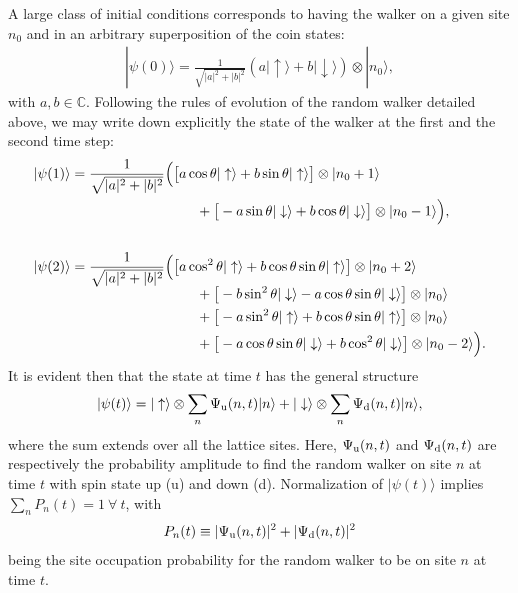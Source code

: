 \documentclass[12pt]{iopart}
\def\uarr{\uparrow}
\def\darr{\downarrow}
\def\ra{\rangle}
\begin{document}
A large class of
initial conditions corresponds to having the walker on a given site
$n_0$ and
in an arbitrary superposition of the coin states: 
\begin{align}
|\psi(0)\ra=\frac{1}{\sqrt{|a|^2+|b|^2}}\left(a|\uarr\ra+b|\darr\ra\right)\otimes
|n_0\ra,
\label{eq:qua-psi0}
\end{align}
with $a,b \in \mathbb{C}$. Following the rules of evolution of the random walker detailed above, we
may write down explicitly the state of the walker at the first and the
second time step:
\begin{equation}
\begin{aligned}
|\psi(1)\ra &=\frac{1}{\sqrt{|a|^2+|b|^2}}\Big(\big[ a \cos\theta
|\uarr\ra+b\sin\theta|\uarr\ra\big]\otimes|n_0+1\ra  \\
&\hskip90pt +\big[-a \sin\theta
|\darr\ra+b\cos \theta|\darr\ra\big]\otimes|n_0-1\ra\Big), \\
\label{eq:qua-qrw-psi12} \\
|\psi(2)\ra&=\frac{1}{\sqrt{|a|^2+|b|^2}}\Big(\big[a \cos^2\theta
|\uarr\ra+b\cos \theta \sin \theta|\uarr\ra\big]\otimes |n_0+2\ra  \\[-1ex]
&\hskip90pt +\big[-b\sin^2\theta |\darr\ra-a\cos
\theta \sin \theta |\darr\ra\big]\otimes|n_0\ra \\
&\hskip90pt +\big[-a \sin^2\theta
|\uarr\ra+b\cos \theta \sin\theta|\uarr\ra\big]\otimes|n_0\ra  \\
&\hskip90pt +\big[-a \cos \theta \sin \theta |\darr\ra+b\cos^2\theta
|\darr\ra\big]\otimes|n_0-2\ra\Big). 
\end{aligned}
\end{equation}
It is evident then that the state at time $t$ has the general structure
\begin{align}
|\psi(t)\ra=|\uarr\ra\otimes\sum_{n}\Psi_{\rm u}(n,t)|n\ra+|\darr\ra\otimes\sum_{n}\Psi_{\rm d}(n,t)|n\ra,
\label{eq:qua-psi-n}
\end{align}
where the sum extends over all the lattice sites. Here, $\Psi_{\rm
u}(n,t)$ and $\Psi_{\rm d}(n,t)$ are respectively the
probability amplitude to find the random walker on site $n$ at time $t$
with spin state up (u) and down (d). Normalization of $|\psi(t)\ra$
implies $\sum_n P_n(t)=1~\forall~t$, with
\begin{align}
P_n(t) \equiv | \Psi_{\rm u}(n,t)|^2+|\Psi_{\rm d}(n,t)|^2 \label{eq:qrw-site-occu-prob}
\end{align}
being the site occupation probability
for the random walker to be on site $n$ at time $t$.
\end{document}
